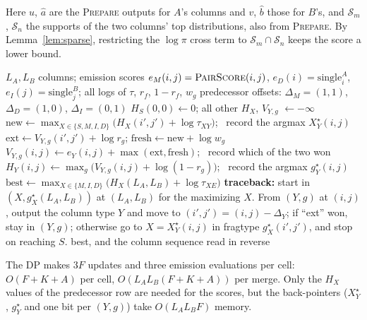 \documentclass[11pt]{article}
\begin{document}
Here $u$, $\hat a$ are the \textsc{Prepare} outputs for $A$'s columns and $v$,
$\hat b$ those for $B$'s, and $\mathcal S_m$, $\mathcal S_n$ the supports of
the two columns' top distributions, also from \textsc{Prepare}. By
Lemma~\ref{lem:sparse}, restricting the $\log\pi$ cross term to
$\mathcal S_m\cap\mathcal S_n$ keeps the score a lower bound.

\begin{algorithm}[p]
\caption{Viterbi alignment of two clade MSAs under the MixFrag Pair HMM}
\label{alg:viterbi}
\begin{algorithmic}[1]
\Require $L_A,L_B$ columns; emission scores $e_M(i,j)=\textsc{PairScore}(i,j)$,
  $e_D(i)=\mathrm{single}^A_i$, $e_I(j)=\mathrm{single}^B_j$; all logs of
  $\tau$, $r_f$, $1-r_f$, $w_g$
  \State predecessor offsets: $\Delta_M=(1,1)$, $\Delta_D=(1,0)$, $\Delta_I=(0,1)$
  \State $H_S(0,0)\gets0$; all other $H_X$, $V_{Y,g}$ $\gets-\infty$
        \State $\mathrm{new}\gets\max_{X\in\{S,M,I,D\}}\big(H_X(i',j')+\log\tau_{XY}\big)$;
          \ record the argmax $X^\star_Y(i,j)$
          \State $\mathrm{ext}\gets V_{Y,g}(i',j')+\log r_g$;
            \quad $\mathrm{fresh}\gets\mathrm{new}+\log w_g$
          \State $V_{Y,g}(i,j)\gets e_Y(i,j)+\max(\mathrm{ext},\mathrm{fresh})$;
            \ record which of the two won
        \EndFor
        \State $H_Y(i,j)\gets\max_g\big(V_{Y,g}(i,j)+\log(1-r_g)\big)$;
          \ record the argmax $g^\star_Y(i,j)$
      \EndFor
    \EndFor
  \EndFor
  \State $\mathrm{best}\gets\max_{X\in\{M,I,D\}}\big(H_X(L_A,L_B)+\log\tau_{XE}\big)$
  \State \textbf{traceback:} start in $(X,g^\star_X(L_A,L_B))$ at $(L_A,L_B)$ for the
    maximizing $X$. From $(Y,g)$ at $(i,j)$, output the column type $Y$ and move to
    $(i',j')=(i,j)-\Delta_Y$; if ``ext'' won, stay in $(Y,g)$; otherwise go to
    $X=X^\star_Y(i,j)$ in fragtype $g^\star_X(i',j')$, and stop on reaching $S$.
  \State \Return best, and the column sequence read in reverse
\EndFunction
\end{algorithmic}
\end{algorithm}

The DP makes $3F$ updates and three emission evaluations per cell: $O(F+K+A)$
per cell, $O(L_AL_B(F+K+A))$ per merge. Only the $H_X$ values of the
predecessor row are needed for the scores, but the back-pointers
($X^\star_Y$, $g^\star_Y$ and one bit per $(Y,g)$) take $O(L_AL_BF)$ memory.
\end{document}
